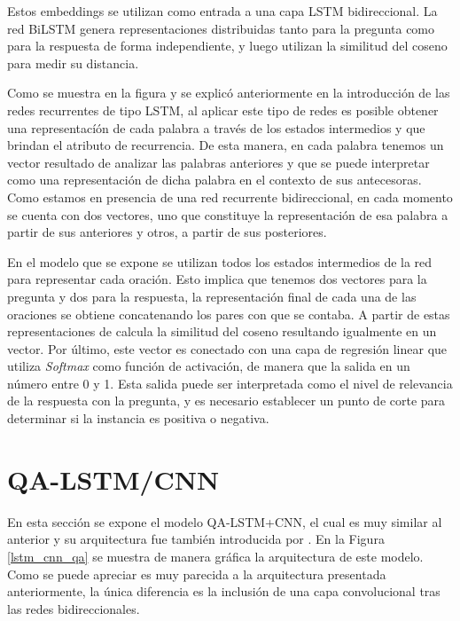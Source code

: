 Estos embeddings se utilizan como entrada a una capa LSTM bidireccional. La red BiLSTM genera representaciones distribuidas tanto para la pregunta como para la respuesta de forma independiente, y luego utilizan la similitud del coseno para medir su distancia. 

Como se muestra en la figura y se explicó anteriormente en la introducción de las redes recurrentes de tipo LSTM, al aplicar este tipo de redes es posible obtener una representacíón de cada palabra a través de los estados intermedios y que brindan el atributo de recurrencia. De esta manera, en cada palabra tenemos un vector resultado de analizar las palabras anteriores y que se puede interpretar como una representación de dicha palabra en el contexto de sus antecesoras. Como estamos en presencia de una red recurrente bidireccional, en cada momento se cuenta con dos vectores, uno que constituye la representación de esa palabra a partir de sus anteriores y otros, a partir de sus posteriores. 

En el modelo que se expone se utilizan todos los estados intermedios de la red para representar cada oración. Esto implica que tenemos dos vectores para la pregunta y dos para la respuesta, la representación final de cada una de las oraciones se obtiene concatenando los pares con que se contaba. A partir de estas representaciones de calcula la similitud del coseno resultando igualmente en un vector. Por último, este vector es conectado con una capa de regresión linear que utiliza \textit{Softmax} como función de activación, de manera que la salida en un número entre 0 y 1. Esta salida puede ser interpretada como el nivel de relevancia de la respuesta con la pregunta, y es necesario establecer un punto de corte para determinar si la instancia es positiva o negativa.

\section{QA-LSTM/CNN}

En esta sección se expone el modelo QA-LSTM+CNN, el cual es muy similar al anterior y su arquitectura fue también introducida por \cite{2015-tan-qalstm}. En la Figura \ref{lstm_cnn_qa} se muestra de manera gráfica la arquitectura de este modelo. Como se puede apreciar es muy parecida a la arquitectura presentada anteriormente, la única diferencia es la inclusión de una capa convolucional tras las redes bidireccionales.

